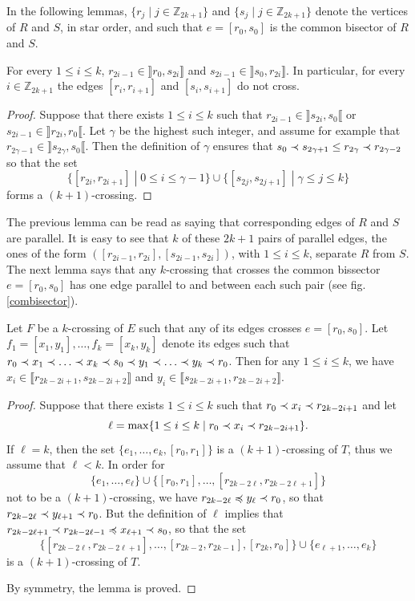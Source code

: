 \documentclass[12pt]{amsart}
\begin{document}
In the following lemmas, $\{r_j\;|\; j\in\mathbb{Z}_{2k+1}\}$ and $\{s_j\;|\; j\in\mathbb{Z}_{2k+1}\}$ denote the vertices of $R$ and $S$, in star order, and such that $e=[r_0,s_0]$ is the common bisector of $R$ and $S$.

\begin{lemma}\label{paralleledges}
For every $1\le i\le k$, $r_{2i-1}\in\rrbracket r_0,s_{2i}\rrbracket$ and $s_{2i-1}\in\rrbracket s_0,r_{2i}\rrbracket$.
In particular, for every $i\in\mathbb{Z}_{2k+1}$ the edges $[r_i,r_{i+1}]$ and $[s_i,s_{i+1}]$ do not cross.
\end{lemma}

\begin{proof}
Suppose that there exists $1\le i\le k$ such that $r_{2i-1}\in\rrbracket s_{2i},s_0\llbracket$ or $s_{2i-1}\in\rrbracket r_{2i},r_0\llbracket$. Let $\gamma$ be the highest such integer, and assume for example that $r_{2\gamma-1}\in\rrbracket s_{2\gamma},s_0\llbracket$. Then the definition of $\gamma$ ensures that
$s_0\prec s_{2\gamma+1}\le r_{2\gamma}\prec r_{2\gamma-2}$
so that the set
$$\{[r_{2i},r_{2i+1}]\;|\; 0\le i\le\gamma-1\}\cup\{[s_{2j},s_{2j+1}]\;|\; \gamma\le j\le k\}$$
forms a $(k+1)$-crossing.
\end{proof}

The previous lemma can be read as saying that corresponding edges of $R$ and $S$ are parallel. It is easy to see that $k$ of these $2k+1$ pairs of parallel edges, the ones of the form $([r_{2i-1},r_{2i}],[s_{2i-1},s_{2i}])$, with $1\le i\le k$, separate $R$ from $S$. The next lemma says that any $k$-crossing that crosses the common bissector $e=[r_0,s_0]$ has one edge parallel to and between each such pair (see fig. \ref{combisector}).

\begin{lemma}\label{sandwich}
Let $F$ be a $k$-crossing of $E$ such that any of its edges crosses $e=[r_0,s_0]$. Let $f_1=[x_1,y_1],\ldots,f_k=[x_k,y_k]$ denote its edges such that $r_0\prec x_1\prec \ldots\prec x_k\prec s_0\prec y_1\prec \ldots\prec y_k\prec r_0$.
Then for any $1\le i\le k$, we have $x_i\in\llbracket r_{2k-2i+1},s_{2k-2i+2}\rrbracket$ and $y_i\in\llbracket s_{2k-2i+1},r_{2k-2i+2}\rrbracket$.
\end{lemma}

\begin{proof}
Suppose that there exists $1\le i\le k$ such that $r_0\prec x_i\prec r_{2k-2i+1}$ and let
$$\ell=\max\{1\le i\le k \;|\; r_0\prec x_i\prec r_{2k-2i+1}\}.$$
If $\ell=k$, then the set $\{e_1,\ldots,e_k,[r_0,r_1]\}$ is a $(k+1)$-crossing of $T$, thus we assume that $\ell<k$. In order for $$\{e_1,\ldots,e_\ell\}\cup\{[r_0,r_1],\ldots,[r_{2k-2\ell},r_{2k-2\ell+1}]\}$$ not to be a $(k+1)$-crossing, we have $r_{2k-2\ell}\preccurlyeq y_\ell\prec r_0$, so that $r_{2k-2\ell}\prec y_{\ell+1}\prec r_0$. But the definition of $\ell$ implies that $r_{2k-2\ell+1}\prec r_{2k-2\ell-1}\preccurlyeq x_{\ell+1}\prec s_0$, so that
the set $$\{[r_{2k-2\ell},r_{2k-2\ell+1}],\ldots,[r_{2k-2},r_{2k-1}],[r_{2k},r_0]\}\cup\{e_{\ell+1},\ldots,e_k\}$$ is a $(k+1)$-crossing of $T$.

By symmetry, the lemma is proved.
\end{proof}
\end{document}
